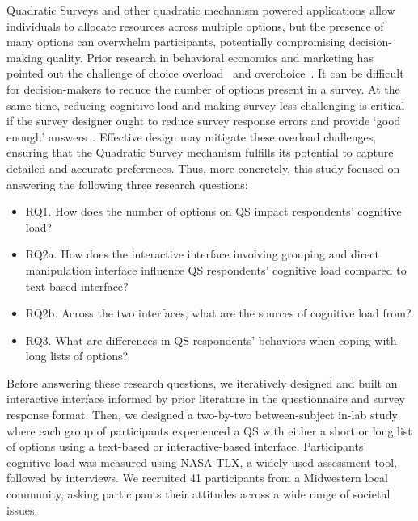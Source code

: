 Quadratic Surveys and other quadratic mechanism powered applications allow individuals to allocate resources across multiple options, but the presence of many options can overwhelm participants, potentially compromising decision-making quality. Prior research in behavioral economics and marketing has pointed out the challenge of choice overload~\cite{iyengarWhenChoiceDemotivating2000} and overchoice~\cite{gourvilleOverchoiceAssortmentType2005}. It can be difficult for decision-makers to reduce the number of options present in a survey. At the same time, reducing cognitive load and making survey less challenging is critical if the survey designer ought to reduce survey response errors and provide `good enough' answers~\cite{lenznerCognitiveBurdenSurvey2010, blessAskingDifficultQuestions1992}. Effective design may mitigate these overload challenges, ensuring that the Quadratic Survey mechanism fulfills its potential to capture detailed and accurate preferences. Thus, more concretely, this study focused on answering the following three research questions:
\begin{itemize}
\item RQ1. How does the number of options on QS impact respondents' cognitive load?
\item RQ2a. How does the interactive interface involving grouping and direct manipulation interface influence QS respondents' cognitive load compared to text-based interface?
\item RQ2b. Across the two interfaces, what are the sources of cognitive load from?
\item RQ3. What are differences in QS respondents' behaviors when coping with long lists of options?
\end{itemize}

Before answering these research questions, we iteratively designed and built an interactive interface informed by prior literature in the questionnaire and survey response format. Then, we designed a two-by-two between-subject in-lab study where each group of participants experienced a QS with either a short or long list of options using a text-based or interactive-based interface. Participants' cognitive load was measured using NASA-TLX, a widely used assessment tool, followed by interviews. We recruited 41 participants from a Midwestern local community, asking participants their attitudes across a wide range of societal issues.

